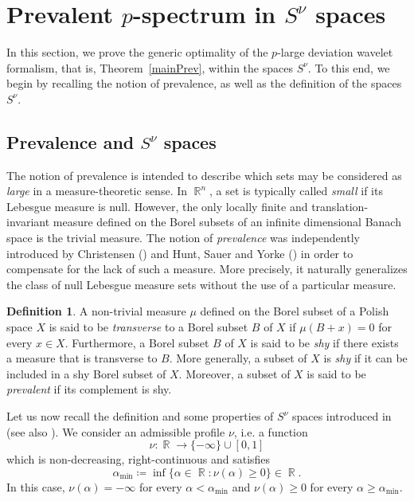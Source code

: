 \documentclass[a4paper,11pt,oneside]{article}
\DeclareMathOperator{\R}{\mathbb{R}}
\newcommand{\ccint}[1]{\left[{#1}\right]}
\theoremstyle{definition}
\newtheorem{defi}{Definition}[section]
\theoremstyle{plain}
\begin{document}
\section{Prevalent $p$-spectrum in $S^\nu$ spaces}\label{secSnutot}

In this section, we prove the generic optimality of the $p$-large deviation wavelet formalism, that is, Theorem~\ref{mainPrev}, within the spaces $S^\nu$. To this end, we begin by recalling the notion of prevalence, as well as the definition of the spaces $S^\nu$.

\subsection{Prevalence and $S^\nu$ spaces}\label{secSnu}



The notion of prevalence is intended to describe which sets may be considered as \textit{large} in a measure-theoretic sense. In $\R^n$, a set is typically called \textit{small} if its Lebesgue measure is null. However, the only locally finite and translation-invariant measure defined on the Borel subsets of an infinite dimensional Banach space is the trivial measure. The notion of \textit{prevalence} was independently introduced by Christensen (\cite{christensen}) and Hunt, Sauer and Yorke (\cite{hunt}) in order to compensate for the lack of such a measure. More precisely, it naturally generalizes the class of null Lebesgue measure sets without the use of a particular measure. 

\begin{defi}
A non-trivial measure $\mu$ defined on the Borel subset of a 
Polish space $X$ is said to be \textit{transverse} to a Borel subset $B$ of $X$ if $\mu(B+x)=0$ for every $x\in X$.
Furthermore, a Borel subset $B$ of $X$ is said to be \textit{shy} if there exists a measure that is transverse to $B$. More generally, a subset of $X$ is \textit{shy} if it can be included in a shy Borel subset of $X$. Moreover, a subset of $X$ is said to be \textit{prevalent} if its complement is shy.
\end{defi}

Let us now recall the definition and some properties of $S^\nu$ spaces introduced in \cite{jaffardBeyond} (see also \cite{aubryTopological}). We consider an admissible profile $\nu$, i.e. a function
\[
\nu:\R\rightarrow\{-\infty\}\cup\ccint{0,1}
\]
which is non-decreasing, right-continuous and satisfies
\[
\alpha_{\min}\coloneqq\inf\{\alpha\in\R:\nu(\alpha)\geq 0\}\in\R.
\]
In this case, $\nu(\alpha)=-\infty$ for every $\alpha<\alpha_{\min}$ and $\nu(\alpha)\geq 0$ for every $\alpha\geq \alpha_{\min}$.
\end{document}
